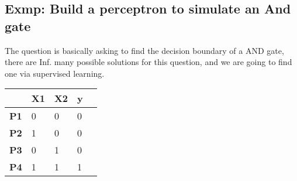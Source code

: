 \begin{center}
\end{center}
\subsection*{Exmp: Build a perceptron to simulate an And gate}
The question is basically asking to find the decision boundary of a AND gate, there are Inf. many possible solutions for this question, and we are going to find one via supervised learning.
\begin{center}
\begin{tabular}{|l|l|l|l|l}
\hline
            & \textbf{X1} & \textbf{X2} & \textbf{y} \\ \hline
\textbf{P1} & 0           & 0           & 0          \\ \cline{1-4}
\textbf{P2} & 1           & 0           & 0          \\ \cline{1-4}
\textbf{P3} & 0           & 1           & 0          \\\cline{1-4}
\textbf{P4} & 1           & 1           & 1          \\ \hline
\end{tabular}
\end{center}

